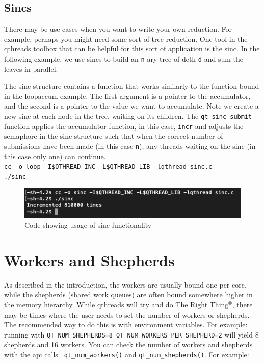 \documentclass[12pt,fullpage]{article}
\begin{document}
\subsection{Sincs}
There may be use cases when you want to write your own reduction. For example,
perhaps you might need some sort of tree-reduction. One tool in the qthreads
toolbox that can be helpful for this sort of application is the sinc. In the
following example, we use sincs to build an {\tt n}-ary tree of deth {\tt d}
and sum the leaves in parallel.

The sinc structure contains a function that works similarly to the function
bound in the loopaccum example. The first argument is a pointer to the
accumulator, and the second is a pointer to the value we want to accumulate.
Note we create a new sinc at each node in the tree, waiting on its children. The
{\tt qt\_sinc\_submit} function applies the accumulator function, in this case,
{\tt incr} and adjusts the semaphore in the sinc structure such that when the
correct number of submissions have been made (in this case {\tt n}), any threads
waiting on the sinc (in this case only one) can continue.
\\
{\footnotesize{\tt cc -o loop -I\$QTHREAD\_INC -L\$QTHREAD\_LIB -lqthread sinc.c}}
\\
{\footnotesize{\tt ./sinc}}
\begin{figure}[h]
\includegraphics[scale=1.0]{sinc.png}
\caption{Code showing usage of sinc functionality}
\end{figure}
\newpage


\newpage
\section{Workers and Shepherds}

As described in the introduction, the workers are usually bound one per core,
while the shepherds (shared work queues) are often bound somewhere higher in the
memory hierarchy. While qthreads will try and do The Right Thing$^{\circledR}$,
there may be times where the user needs to set the number of workers or
shepherds. The recommended way to do this is with environment variables. For
example: running with {\tt QT\_NUM\_SHEPHERDS=8
QT\_NUM\_WORKERS\_PER\_SHEPHERD=2} will yield 8 shepherds and 16 workers. You
can check the number of workers and shepherds with the api calls {\tt
qt\_num\_workers()} and {\tt qt\_num\_shepherds()}. For example:
\end{document}
